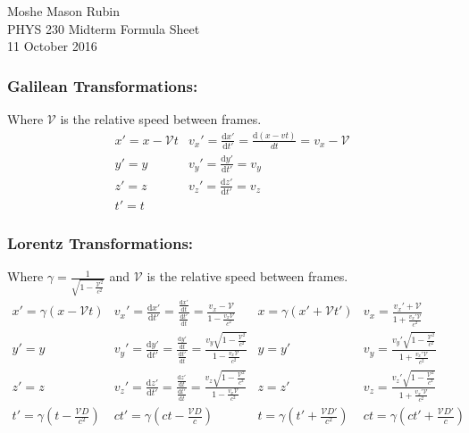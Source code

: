 \documentclass{article}
\begin{document}
		\begin{flushright}
		Moshe Mason Rubin\\PHYS 230 Midterm Formula Sheet\\11 October 2016
	\end{flushright}
	
	\subsubsection*{Galilean Transformations:} Where $\mathcal{V}$ is the relative speed between frames.
	\[
		\begin{array}{cc}
			x'=x-\mathcal{V}t &  v_x'=\frac{\mathrm{d}x'}{\mathrm{d}t'}=\frac{\mathrm{d}\left(x-vt\right)}{dt}=v_x-\mathcal{V}\\ 
			y'=y &  v_y'=\frac{\mathrm{d}y'}{\mathrm{d}t'}=v_y\\ 
			z'=z &  v_z'=\frac{\mathrm{d}z'}{\mathrm{d}t'}=v_z\\ 
			t'=t & 
		\end{array} 
		\]
		
	\subsubsection*{Lorentz Transformations:} Where  $\gamma=\frac{1}{\sqrt{1-\frac{\mathcal{V}^2}{c^2}}}$ and $\mathcal{V}$ is the relative speed between frames. 
	\[
		\begin{array}{cc|cc}
			x'=\gamma(x-\mathcal{V}t)	&	v_x'=\frac{\mathrm{d}x'}{\mathrm{d}t'}=\frac{\frac{\mathrm{d}x'}{\mathrm{d}t}}{\frac{\mathrm{d}t'}{\mathrm{d}t}} = \frac{v_x-\mathcal{V}}{1-\frac{v_x\mathcal{V}}{c^2}}	&	x=\gamma\left(x'+\mathcal{V}t'\right)	&	v_x=\frac{v_x'+\mathcal{V}}{1+\frac{v_x'\mathcal{V}}{c^2}}\\
			y'=y	&	v_y'=\frac{\mathrm{d}y'}{\mathrm{d}t'}=\frac{\frac{\mathrm{d}y'}{\mathrm{d}t}}{\frac{\mathrm{d}t'}{\mathrm{d}t}}=\frac{v_y\sqrt{1-\frac{\mathcal{V}^2}{c^2}}}{1-\frac{v_x\mathcal{V}}{c^2}}	&	y=y'	&	v_y=\frac{v_y'\sqrt{1-\frac{\mathcal{V}^2}{c^2}}}{1+\frac{v_x'\mathcal{V}}{c^2}}\\
			z'=z	&	v_z'=\frac{\mathrm{d}z'}{\mathrm{d}t'}=\frac{\frac{\mathrm{d}z'}{\mathrm{d}t}}{\frac{\mathrm{d}t'}{\mathrm{d}t}}=\frac{v_z\sqrt{1-\frac{\mathcal{V}^2}{c^2}}}{1-\frac{v_x\mathcal{V}}{c^2}}	&	z=z'	&	v_z=\frac{v_z'\sqrt{1-\frac{\mathcal{V}^2}{c^2}}}{1+\frac{v_x'\mathcal{V}}{c^2}}\\
			t'=\gamma\left(t-\frac{\mathcal{V}D}{c^2}\right)	&	ct'=\gamma\left(ct-\frac{\mathcal{V}D}{c}\right)	&	t=\gamma\left(t'+\frac{\mathcal{V}D'}{c^2}\right)	&	ct=\gamma\left(ct'+\frac{\mathcal{V}D'}{c}\right)
		\end{array}
	\]
	
\end{document}
